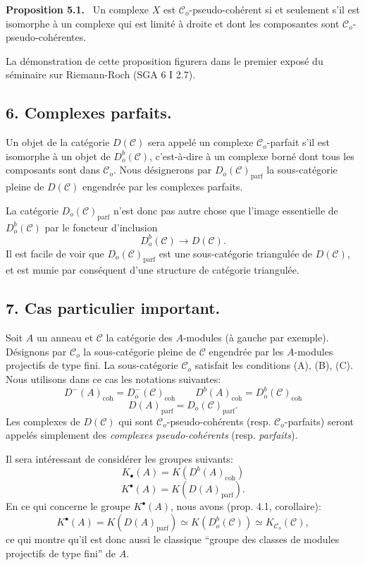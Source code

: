 \documentclass[11pt]{article}
\newenvironment{statement}[1]{\par\medskip\noindent\textbf{#1.}\ }{\par\medskip}
\providecommand{\parf}{\mathrm{parf}}
\providecommand{\coh}{\mathrm{coh}}
\providecommand{\cC}{\mathcal C}
\providecommand{\cC}{\mathcal C}
\providecommand{\parf}{\mathrm{parf}}
\providecommand{\coh}{\mathrm{coh}}
\begin{document}
\begin{statement}{Proposition 5.1}
Un complexe $X$ est $\cC_o$-pseudo-cohérent si et seulement s'il est isomorphe à un complexe qui est limité à droite et dont les composantes sont $\cC_o$-pseudo-cohérentes.
\end{statement}

La démonstration de cette proposition figurera dans le premier exposé du séminaire sur Riemann-Roch (SGA 6 I 2.7).

\subsection*{6. Complexes parfaits.}

Un objet de la catégorie $D(\cC)$ sera appelé un complexe $\cC_o$-parfait s'il est isomorphe à un objet de $D_o^b(\cC)$, c'est-à-dire à un complexe borné dont tous les composants sont dans $\cC_o$. Nous désignerons par $D_o(\cC)_{\parf}$ la sous-catégorie pleine de $D(\cC)$ engendrée par les complexes parfaits.

La catégorie $D_o(\cC)_{\parf}$ n'est donc pas autre chose que l'image essentielle de $D_o^b(\cC)$ par le foncteur d'inclusion
\[
D_o^b(\cC)\longrightarrow D(\cC).
\]
Il est facile de voir que $D_o(\cC)_{\parf}$ est une sous-catégorie triangulée de $D(\cC)$, et est munie par conséquent d'une structure de catégorie triangulée.

\subsection*{7. Cas particulier important.}

Soit $A$ un anneau et $\cC$ la catégorie des $A$-modules (à gauche par exemple). Désignons par $\cC_o$ la sous-catégorie pleine de $\cC$ engendrée par les $A$-modules projectifs de type fini. La sous-catégorie $\cC_o$ satisfait les conditions (A), (B), 
(C).
Nous utilisons dans ce cas les notations suivantes:
\[
D^-(A)_{\coh}=D_o^-(\cC)_{\coh}\qquad
D^b(A)_{\coh}=D_o^b(\cC)_{\coh}
\]
\[
D(A)_{\parf}=D_o(\cC)_{\parf}.
\]
Les complexes de $D(\cC)$ qui sont $\cC_o$-pseudo-cohérents (resp. $\cC_o$-parfaits) seront appelés simplement des \emph{complexes pseudo-cohérents} (resp. \emph{parfaits}).

Il sera intéressant de considérer les groupes suivants:
\[
K_\bullet(A)=K(D^b(A)_{\coh})
\]
\[
K^\bullet(A)=K(D(A)_{\parf}).
\]
En ce qui concerne le groupe $K^\bullet(A)$, nous avons (prop. 4.1, corollaire):
\[
K^\bullet(A)=K(D(A)_{\parf})\simeq K(D_o^b(\cC))\simeq K_{\cC_o}(\cC),
\]
ce qui montre qu'il est donc aussi le classique ``groupe des classes de modules projectifs de type fini'' de $A$.
\end{document}
